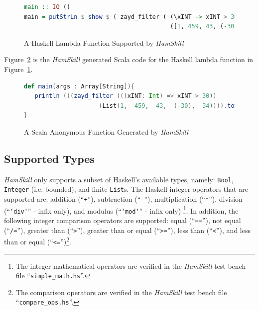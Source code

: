 \documentclass{report}
\begin{document}
\begin{figure}[H]
\begin{mdframed}
\begin{lstlisting}[language=Haskell, basicstyle=\scriptsize]
main :: IO ()
main = putStrLn $ show $ ( zayd_filter ( (\xINT -> xINT > 30) ) 
                                         ([1, 459, 43, (-30), 34]) )
\end{lstlisting}
\end{mdframed}
\caption{A Haskell Lambda Function Supported by \textit{HamSkill}}\label{fig:haskellLambdaFunction}
\end{figure}

Figure~\ref{fig:scalaLambdaFunction} is the \textit{HamSkill} generated Scala code for the Haskell lambda function in Figure~\ref{fig:haskellLambdaFunction}.

\begin{figure}[H]
\begin{mdframed}
\begin{lstlisting}[language=Scala, basicstyle=\scriptsize]
def main(args : Array[String]){
   println (((zayd_filter (((xINT: Int) => xINT > 30)) 
                     (List(1,  459,  43,  (-30),  34)))).toString())
} 
\end{lstlisting}
\end{mdframed}
\caption{A Scala Anonymous Function Generated by \textit{HamSkill}}\label{fig:scalaLambdaFunction}
\end{figure}

\subsection{Supported Types}\label{sec:supportedTypes}

\emph{HamSkill} only supports a subset of Haskell's available types, namely: \texttt{Bool}, \texttt{\tt Integer} (i.e. bounded), and finite \texttt{List}s.  The Haskell integer operators that are supported are: addition (``\texttt{+}''), subtraction (``\texttt{-}''), multiplication (``\texttt{*}''), division (``\texttt{`div`}'' - infix only), and modulus (``\texttt{`mod`}'' - infix only) \footnote{The integer mathematical operators are verified in the \textit{HamSkill} test bench file ``\texttt{simple\_math.hs}''.}.  In addition, the following integer comparison operators are supported: equal (``\texttt{==}''), not equal (``\texttt{/=}''), greater than (``\texttt{>}''), greater than or equal (``\texttt{>=}''), less than (``\texttt{<}''), and less than or equal (``\texttt{<=}'')\footnote{The comparison operators are verified in the \textit{HamSkill} test bench file ``\texttt{compare\_ops.hs}''.}.
\end{document}
